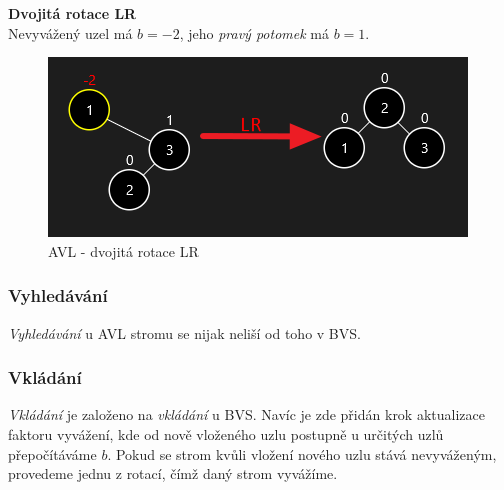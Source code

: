 \documentclass[
  biblatex=false,
  font=serif,
  glossaries=false,
  tables=false,
  theorems=false,
  index
]{kidiplom}
\begin{document}
\noindent\textbf{Dvojitá rotace LR}\\
\noindent Nevyvážený uzel má $b = -2$, jeho \textit{pravý potomek} má $b = 1$.
\begin{figure}[h!]
\centering
	\includegraphics[scale=0.8]{obrazky/14LR.png}
	\caption{AVL - dvojitá rotace LR}
\end{figure}

\subsubsection{Vyhledávání}
\indent\indent \textit{Vyhledávání} u AVL stromu se nijak neliší od toho v BVS.

\subsubsection{Vkládání}
\indent\indent \textit{Vkládání} je založeno na \textit{vkládání} u BVS. Navíc je zde přidán krok aktualizace faktoru vyvážení, kde od nově vloženého uzlu postupně u určitých uzlů přepočítáváme $b$. Pokud se strom kvůli vložení nového uzlu stává nevyváženým, provedeme jednu z rotací, čímž daný strom vyvážíme.\\
\end{document}
